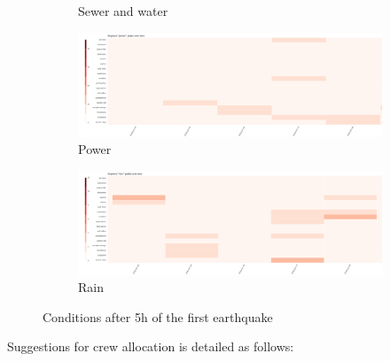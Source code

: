 \begin{figure}[!h]
\begin{subfigure}[!h]{0.32\textwidth}
        \caption{Sewer and water}
        \label{fig:sewer_5h}
    \end{subfigure}
    \begin{subfigure}[!h]{0.32\textwidth}
        \centering
        \includegraphics[width=1.00\textwidth]{figs/q1/cond_5h/cond_5h_power.png}
        \caption{Power}
        \label{fig:power_5h}
    \end{subfigure}
    \begin{subfigure}[!h]{0.32\textwidth}
        \centering
        \includegraphics[width=1.00\textwidth]{figs/q1/cond_5h/cond_5h_rain.png}
        \caption{Rain}
        \label{fig:rain_5h}
    \end{subfigure}
    \caption{Conditions after 5h of the first earthquake}
    \label{fig:eq_cond_5h}
\end{figure}

Suggestions for crew allocation is detailed as follows: 


